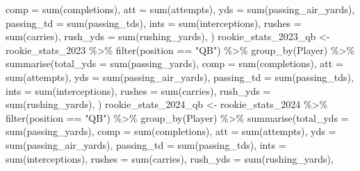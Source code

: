 \documentclass[
  letterpaper,
  DIV=11,
  numbers=noendperiod]{scrartcl}
\newenvironment{Shaded}{\begin{snugshade}}{\end{snugshade}}
\newcommand{\AttributeTok}[1]{\textcolor[rgb]{0.40,0.45,0.13}{#1}}
\newcommand{\FunctionTok}[1]{\textcolor[rgb]{0.28,0.35,0.67}{#1}}
\newcommand{\NormalTok}[1]{\textcolor[rgb]{0.00,0.23,0.31}{#1}}
\newcommand{\OtherTok}[1]{\textcolor[rgb]{0.00,0.23,0.31}{#1}}
\newcommand{\SpecialCharTok}[1]{\textcolor[rgb]{0.37,0.37,0.37}{#1}}
\newcommand{\StringTok}[1]{\textcolor[rgb]{0.13,0.47,0.30}{#1}}
\begin{document}
\begin{Shaded}
\begin{Highlighting}[]
            \AttributeTok{comp =} \FunctionTok{sum}\NormalTok{(completions),}
            \AttributeTok{att =} \FunctionTok{sum}\NormalTok{(attempts),}
            \AttributeTok{yds =} \FunctionTok{sum}\NormalTok{(passing\_air\_yards),}
            \AttributeTok{passing\_td =} \FunctionTok{sum}\NormalTok{(passing\_tds),}
            \AttributeTok{ints =} \FunctionTok{sum}\NormalTok{(interceptions),}
            \AttributeTok{rushes =} \FunctionTok{sum}\NormalTok{(carries),}
            \AttributeTok{rush\_yds =} \FunctionTok{sum}\NormalTok{(rushing\_yards),}
\NormalTok{  )}
\NormalTok{rookie\_stats\_2023\_qb }\OtherTok{\textless{}{-}}\NormalTok{ rookie\_stats\_2023 }\SpecialCharTok{\%\textgreater{}\%}
  \FunctionTok{filter}\NormalTok{(position }\SpecialCharTok{==} \StringTok{"QB"}\NormalTok{) }\SpecialCharTok{\%\textgreater{}\%}
  \FunctionTok{group\_by}\NormalTok{(Player) }\SpecialCharTok{\%\textgreater{}\%}
  \FunctionTok{summarise}\NormalTok{(}\AttributeTok{total\_yds =} \FunctionTok{sum}\NormalTok{(passing\_yards),}
            \AttributeTok{comp =} \FunctionTok{sum}\NormalTok{(completions),}
            \AttributeTok{att =} \FunctionTok{sum}\NormalTok{(attempts),}
            \AttributeTok{yds =} \FunctionTok{sum}\NormalTok{(passing\_air\_yards),}
            \AttributeTok{passing\_td =} \FunctionTok{sum}\NormalTok{(passing\_tds),}
            \AttributeTok{ints =} \FunctionTok{sum}\NormalTok{(interceptions),}
            \AttributeTok{rushes =} \FunctionTok{sum}\NormalTok{(carries),}
            \AttributeTok{rush\_yds =} \FunctionTok{sum}\NormalTok{(rushing\_yards),}
\NormalTok{  )}
\NormalTok{rookie\_stats\_2024\_qb }\OtherTok{\textless{}{-}}\NormalTok{ rookie\_stats\_2024 }\SpecialCharTok{\%\textgreater{}\%}
  \FunctionTok{filter}\NormalTok{(position }\SpecialCharTok{==} \StringTok{"QB"}\NormalTok{) }\SpecialCharTok{\%\textgreater{}\%}
  \FunctionTok{group\_by}\NormalTok{(Player) }\SpecialCharTok{\%\textgreater{}\%}
  \FunctionTok{summarise}\NormalTok{(}\AttributeTok{total\_yds =} \FunctionTok{sum}\NormalTok{(passing\_yards),}
            \AttributeTok{comp =} \FunctionTok{sum}\NormalTok{(completions),}
            \AttributeTok{att =} \FunctionTok{sum}\NormalTok{(attempts),}
            \AttributeTok{yds =} \FunctionTok{sum}\NormalTok{(passing\_air\_yards),}
            \AttributeTok{passing\_td =} \FunctionTok{sum}\NormalTok{(passing\_tds),}
            \AttributeTok{ints =} \FunctionTok{sum}\NormalTok{(interceptions),}
            \AttributeTok{rushes =} \FunctionTok{sum}\NormalTok{(carries),}
            \AttributeTok{rush\_yds =} \FunctionTok{sum}\NormalTok{(rushing\_yards),}

\end{Highlighting}
\end{Shaded}
\end{document}
